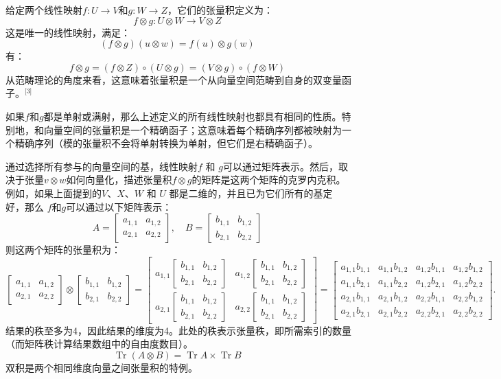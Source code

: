 给定两个线性映射\( f: U \to V \)和\( g: W \to Z \)，它们的张量积定义为：
\[
f \otimes g: U \otimes W \to V \otimes Z~
\]
这是唯一的线性映射，满足：
\[
(f \otimes g)(u \otimes w) = f(u) \otimes g(w)~
\]
有：
\[
f \otimes g = (f \otimes Z) \circ (U \otimes g) = (V \otimes g) \circ (f \otimes W)~
\]
从范畴理论的角度来看，这意味着张量积是一个从向量空间范畴到自身的双变量函子。\(^\text{[3]}\)

如果\( f \)和\( g \)都是单射或满射，那么上述定义的所有线性映射也都具有相同的性质。特别地，和向量空间的张量积是一个精确函子；这意味着每个精确序列都被映射为一个精确序列（模的张量积不会将单射转换为单射，但它们是右精确函子）。

通过选择所有参与的向量空间的基，线性映射\( f \) 和 \( g \)可以通过矩阵表示。然后，取决于张量\( v \otimes w \)如何向量化，描述张量积\( f \otimes g \)的矩阵是这两个矩阵的克罗内克积。例如，如果上面提到的\( V \)、\( X \)、\( W \) 和 \( U \) 都是二维的，并且已为它们所有的基定好，那么 \( f \)和\( g \)可以通过以下矩阵表示：
\[
A = \begin{bmatrix} a_{1,1} & a_{1,2} \\ a_{2,1} & a_{2,2} \end{bmatrix}, \quad B = \begin{bmatrix} b_{1,1} & b_{1,2} \\ b_{2,1} & b_{2,2} \end{bmatrix}~
\]
则这两个矩阵的张量积为：
\[
\begin{bmatrix}
a_{1,1} & a_{1,2} \\
a_{2,1} & a_{2,2}
\end{bmatrix}
\otimes
\begin{bmatrix}
b_{1,1} & b_{1,2} \\
b_{2,1} & b_{2,2}
\end{bmatrix}
=
\begin{bmatrix}
a_{1,1}\begin{bmatrix}b_{1,1} & b_{1,2} \\ b_{2,1} & b_{2,2}\end{bmatrix} & a_{1,2}\begin{bmatrix}b_{1,1} & b_{1,2} \\ b_{2,1} & b_{2,2}\end{bmatrix} \\
a_{2,1}\begin{bmatrix}b_{1,1} & b_{1,2} \\ b_{2,1} & b_{2,2}\end{bmatrix} & a_{2,2}\begin{bmatrix}b_{1,1} & b_{1,2} \\ b_{2,1} & b_{2,2}\end{bmatrix}
\end{bmatrix}
=
\begin{bmatrix}
a_{1,1}b_{1,1} & a_{1,1}b_{1,2} & a_{1,2}b_{1,1} & a_{1,2}b_{1,2} \\
a_{1,1}b_{2,1} & a_{1,1}b_{2,2} & a_{1,2}b_{2,1} & a_{1,2}b_{2,2} \\
a_{2,1}b_{1,1} & a_{2,1}b_{1,2} & a_{2,2}b_{1,1} & a_{2,2}b_{1,2} \\
a_{2,1}b_{2,1} & a_{2,1}b_{2,2} & a_{2,2}b_{2,1} & a_{2,2}b_{2,2}
\end{bmatrix}.~
\]
结果的秩至多为4，因此结果的维度为4。此处的秩表示张量秩，即所需索引的数量（而矩阵秩计算结果数组中的自由度数目）。
\[
\operatorname{Tr} (A \otimes B) = \operatorname{Tr} A \times \operatorname{Tr} B~
\]
双积是两个相同维度向量之间张量积的特例。

